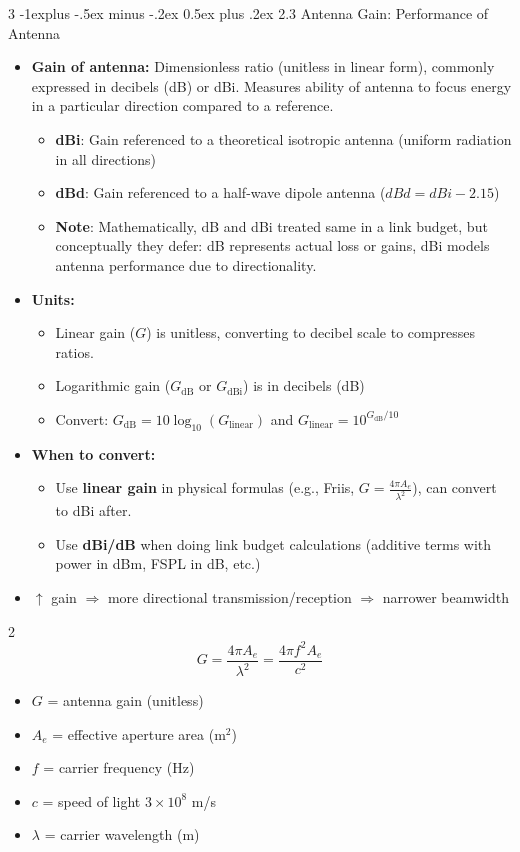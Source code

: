 \documentclass[a4paper, 9pt, landscape]{extarticle}
\makeatletter
\renewcommand{\subsection}{\@startsection{subsection}{2}{0mm}%
                                {-1explus -.5ex minus -.2ex}%
                                {0.5ex plus .2ex}%
                                {\normalfont\normalsize\bfseries}}
\makeatother
\begin{document}
\begin{multicols*}{3}
\subsection{2.3 Antenna Gain: Performance of Antenna}
\begin{itemize}
  \item \textbf{Gain of antenna:} Dimensionless ratio (unitless in linear form), commonly expressed in decibels (dB) or dBi. Measures ability of antenna to focus energy in a particular direction compared to a reference.
  \begin{itemize}
    \item \textbf{dBi}: Gain referenced to a theoretical isotropic antenna (uniform radiation in all directions)
    \item \textbf{dBd}: Gain referenced to a half-wave dipole antenna ($dBd = dBi - 2.15$)
    \item \textbf{Note}: Mathematically, dB and dBi treated same in a link budget, but conceptually they defer: dB represents actual loss or gains, dBi models antenna performance due to directionality.
  \end{itemize}
  \item \textbf{Units:}
  \begin{itemize}
    \item Linear gain ($G$) is unitless, converting to decibel scale to compresses ratios.
    \item Logarithmic gain ($G_{\text{dB}}$ or $G_{\text{dBi}}$) is in decibels (dB)
    \item Convert: $G_{\text{dB}} = 10 \log_{10}(G_{\text{linear}})$ and $G_{\text{linear}} = 10^{G_{\text{dB}} / 10}$
  \end{itemize}
  \item \textbf{When to convert:}
  \begin{itemize}
    \item Use \textbf{linear gain} in physical formulas (e.g., Friis, $G = \frac{4 \pi A_e}{\lambda^2}$), can convert to dBi after.
    \item Use \textbf{dBi/dB} when doing link budget calculations (additive terms with power in dBm, FSPL in dB, etc.)
  \end{itemize}
  \item $\uparrow$ gain $\Rightarrow$ more directional transmission/reception $\Rightarrow$ narrower beamwidth
\end{itemize}

\begin{multicols}{2}
  \[
    \boxed{G = \frac{4 \pi A_e}{\lambda^2} = \frac{4 \pi f^2 A_e}{c^2}}
  \]
  \columnbreak
  \begin{itemize}
    \item $G$ = antenna gain (unitless)
    \item $A_e$ = effective aperture area (m$^2$)
    \item $f$ = carrier frequency (Hz)
    \item $c$ = speed of light $3 \times 10^8$ m/s
    \item $\lambda$ = carrier wavelength (m)
  \end{itemize}
\end{multicols}


\end{multicols*}
\end{document}
